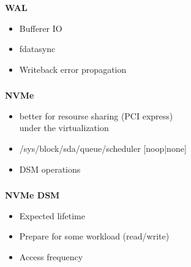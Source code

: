 \documentclass[usenames,dvipsnames, 18pt, compress, aspectratio=169]{beamer}
\begin{document}
\begin{frame}
\begin{center}
{
        }

    \end{center}
\end{frame}

\begin{frame}
    \frametitle{}
    \begin{center}
    \textbf{WAL}

        \begin{itemize}[label={\MVRightarrow}]
            \item Bufferer IO
            \item fdatasync
            \item Writeback error propagation
        \end{itemize}

    \end{center}
\end{frame}

\begin{frame}
    \frametitle{}
    \begin{center}
    \textbf{NVMe}

        \begin{itemize}[label={\MVRightarrow}]
            \item better for resourse sharing (PCI express) \\
                under the virtualization
            \item /sys/block/sda/queue/scheduler [noop|none]
            \item DSM operations
        \end{itemize}

    \end{center}
\end{frame}

\begin{frame}
    \frametitle{}
    \begin{center}
    \textbf{NVMe DSM}

        \begin{itemize}[label={\MVRightarrow}]
            \item Expected lifetime
            \item Prepare for some workload (read/write)
            \item Access frequency
        \end{itemize}

    \end{center}
\end{frame}
\end{document}
